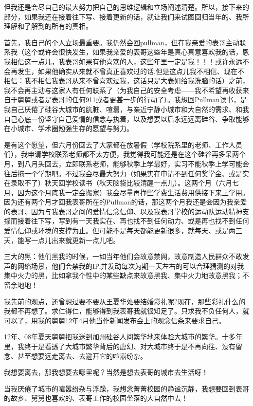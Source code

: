 \documentclass[9pt, b5paper]{article}
\begin{document}
但我还是会尽自己的最大努力把自己的思维逻辑和立场阐述清楚。所以，接下来的部分，如果我还在接着往下写、接着更新的话，就让我们来试图回归当年的、我所理解和了解到的所有的真相。

首先，我自己的个人立场最重要。我仍然会回pullman，但在我亲爱的表哥主动联系我（这个或许会很快发生，如果我亲爱的表哥这些年是真心真意喜欢我的话，恩我相信这一点儿，我表哥如果有他喜欢的人，这些年里一定是我！！！或许永远不会再发生，如果他确实从来就不曾真正喜欢过的话,但是这点儿我不相信、现在不相信：我不相信我表哥从来不曾喜欢过我，这话只是大表姐给我洗脑的话）之前，我不会再主动与这家人有任何联系了（为我自己的安全考虑——我不希望再收获来自于舅舅或者是表哥的任何911或者更甚一步的行动了）。我想回Pullman读书，是我自己厌倦了硅谷大城市的肮脏、喧嚣，与亲近宁静小城市和大自然的需求、和我自己心底一份坚守自己爱情的信念与执着，以及想要以后永远远离硅谷、争取能够在小城市、学术圈勉强生存的愿望与努力。

是有这个愿望，但六月份回去了大家都在放暑假（学校院系里的老师、工作人员们），我申请学校联系老师都不太方便，我觉得我可能还是在这个硅谷再多呆两个月，到八月头回去，立即联系老师，能够秋季上学最好，实习不能秋季上学可能会往后拖一个学期吧。不过我会尽最大努力（如果实在申请不到任何奖学金、或是实在录取不了）秋天回学校读书（秋天脑袋比较清醒一点儿）。这两个月（六月七月，因为这个月底我一定会搬家）我会尽量再挣些学费生活费用供接下来上学用。因为还有两个月才回我表哥所在的Pullman的话，那这两个月我还是会因为我亲爱的表哥、因为与我表哥之间的爱情信念信仰、以及我表哥学校的运动队运动精神支撑而接着往下写，写到有一天我实在、再也找不到任何动力、或是再也找不到任何爱情信仰或环境的支撑为止。但可能不是每天都能更新很多，就每天、或是两三天，能写一点儿出来就更新一点儿吧。

三大的黑：他们黑我的时候，一如当年他们会故意禁网，故意制造人民群众不敢发声的网络场景，他们会禁我的IP,并发动每次为期一天左右的可以合理猜测的对我集中火力的黑，比如拿我个性中的某些缺点来故意黑我、集中火力地故意黑我；不留余地地！

我先前的观点，还曾想过要不要从王夏华处要结婚彩礼呢?现在，那些彩礼什么的我都不再想了。求仁得仁，能够得到我表哥我就很知足了。只求我不负任何人，就可以了，用我的舅舅12年4月他当作新闻发布会上的观念信条来要求自己。

12年、08年夏天舅舅把我送到加州硅谷人间繁华地来体验大城市的繁华。十多年里，我终于是看透了大城市繁华背后的虚幻、对大城市终于是不再向往、没有留念、甚至想要远走离去、去避开它的喧嚣纷杂。

我想要离去，那我想要去哪里呢？当然是想去表哥的城市去生活呀！

当我厌倦了城市的喧嚣纷杂与浮躁，我想念菁菁校园的静谧沉静，我想要回到表哥的故乡、舅舅也喜欢的、表哥工作的校园坐落的大自然中去！
\end{document}
